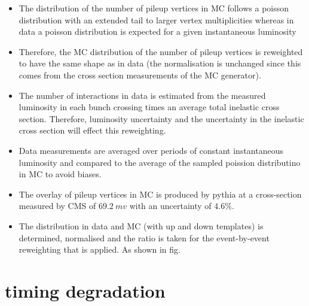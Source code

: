 \begin{itemize}
    \item The distribution of the number of pileup vertices in MC follows a poisson distribution with an extended tail to larger vertex multiplicities whereas in data a poisson distribution is expected for a given instantaneous luminosity
    \item Therefore, the MC distribution of the number of pileup vertices is reweighted to have the same shape as in data (the normalisation is unchanged since this comes from the cross section measurements of the MC generator).
    \item The number of interactions in data is estimated from the measured luminosity in each bunch crossing times an average total inelastic cross section. Therefore, luminosity uncertainty and the uncertainty in the inelastic cross section will effect this reweighting.
    \item Data measurements are averaged over periods of constant instantaneous luminosity and compared to the average of the sampled poission distributino in MC to avoid biases.
    \item The overlay of pileup vertices in MC is produced by pythia at a cross-section measured by CMS of $\SI{69.2}{mv}$ with an uncertainty of $4.6\%$.
    \item The distribution in data and MC (with up and down templates) is determined, normalised and the ratio is taken for the event-by-event reweighting that is applied. As shown in fig.
\end{itemize}


\section{\ECAL timing degradation}

